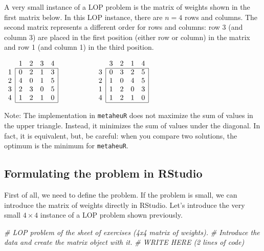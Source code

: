 \documentclass[
]{article}
\newenvironment{Shaded}{\begin{snugshade}}{\end{snugshade}}
\newcommand{\CommentTok}[1]{\textcolor[rgb]{0.56,0.35,0.01}{\textit{#1}}}
\begin{document}
A very small instance of a LOP problem is the matrix of weights shown in
the first matrix below. In this LOP instance, there are \(n=4\) rows and
columns. The second matrix represents a different order for rows and
columns: row 3 (and column 3) are placed in the first position (either
row or column) in the matrix and row 1 (and column 1) in the third
position.

\begin{center}
$\begin{array}{c|rrrr|r|rrrr|}

\multicolumn{1}{c}{} & 1 & 2 & 3 & \multicolumn{1}{c}{4}& 
       \multicolumn{1}{c}{\hspace{2cm} } & 3 & 2 & 1 & \multicolumn{1}{c}{4} \\
\cline{2-5} \cline{7-10}
1 & 0 & 2 & 1 & 3 &   3 & 0 & 3 & 2 & 5\\
2 & 4 & 0 & 1 & 5 &   2 & 1 & 0 & 4 & 5\\
3 & 2 & 3 & 0 & 5 &   1 & 1 & 2 & 0 & 3\\
4 & 1 & 2 & 1 & 0 &   4 & 1 & 2 & 1 & 0\\
\cline{2-5} \cline{7-10}
\end{array}$
\end{center}

Note: The implementation in \texttt{metaheuR} does not maximize the sum
of values in the upper triangle. Instead, it minimizes the sum of values
under the diagonal. In fact, it is equivalent, but, be careful: when you
compare two solutions, the optimum is the minimum for \texttt{metaheuR}.

\hypertarget{formulating-the-problem-in-rstudio}{%
\subsection{Formulating the problem in
RStudio}\label{formulating-the-problem-in-rstudio}}

First of all, we need to define the problem. If the problem is small, we
can introduce the matrix of weights directly in RStudio. Let's introduce
the very small \(4 \times 4\) instance of a LOP problem shown
previously.

\begin{Shaded}
\begin{Highlighting}[]
\CommentTok{\# LOP problem of the sheet of exercises (4x4 matrix of weights).}
\CommentTok{\# Introduce the data and create the matrix object with it.}
\CommentTok{\# WRITE HERE (2 lines of code)}
\end{Highlighting}
\end{Shaded}
\end{document}
